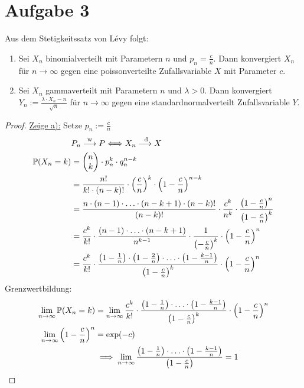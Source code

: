 \documentclass[12pt,a4paper]{article}
\begin{document}
\section*{Aufgabe 3}
Aus dem Stetigkeitssatz von Lévy folgt:
\begin{enumerate}[label=\alph*)]
	\item Sei $X_n$ binomialverteilt mit Parametern $n$ und $p_n=\frac{c}{n}$.
	Dann konvergiert $X_n$ für $n\to\infty$ gegen eine poissonverteilte Zufallsvariable $X$ mit Parameter $c$.
	\item Sei $X_n$ gammaverteilt mit Parametern $n$ und $\lambda>0$.
	Dann konvergiert $Y_n:=\frac{\lambda\cdot X_n-n}{\sqrt{n}}$ für $n\to\infty$ gegen eine standardnormalverteilt Zufallsvariable $Y$.
\end{enumerate}

\begin{proof}
	\underline{Zeige a):} Setze $p_n:=\frac{c}{n}$
	\begin{align*}
		&P_n\overset{\text{w}}{\longrightarrow} P
		\Longleftrightarrow X_n\overset{\text{ d}}{\longrightarrow} X\\
		\mathbb{P}(X_n=k)&=\begin{pmatrix}
			n\\
			k
		\end{pmatrix}\cdot p_n^k\cdot q_n^{n-k}\\
		&=\frac{n!}{k!\cdot(n-k)!}\cdot\left(\frac{c}{n}\right)^k\cdot\left(1-\frac{c}{n}\right)^{n-k}\\
		&=\frac{n\cdot(n-1)\cdot\ldots\cdot(n-k+1)\cdot(n-k)!}{(n-k)!}\cdot\frac{c^k}{n^k}\cdot\frac{\left(1-\frac{c}{n}\right)^n}{\left(1-\frac{c}{n}\right)^k}\\
		&=\frac{c^k}{k!}\cdot\frac{(n-1)\cdot\ldots\cdot(n-k+1)}{n^{k-1}}\cdot\frac{1}{\left(-\frac{c}{n}\right)^k}\cdot\left(1-\frac{c}{n}\right)^n\\
		&=\frac{c^k}{k!}\cdot\frac{\left(1-\frac{1}{n}\right)\cdot\left(1-\frac{2}{n}\right)\cdot\ldots\cdot\left(1-\frac{k-1}{n}\right)}{\left(1-\frac{c}{n}\right)^k}\cdot\left(1-\frac{c}{n}\right)^n
	\end{align*}
	Grenzwertbildung:
	\begin{align*}
		\lim\limits_{n\to\infty}\mathbb{P}(X_n=k)
		&=\lim\limits_{n\to\infty}\frac{c^k}{k!}\cdot\frac{\left(1-\frac{1}{n}\right)\cdot\ldots\cdot\left(1-\frac{k-1}{n}\right)}{\left(1-\frac{c}{n}\right)^k}\cdot\left(1-\frac{c}{n}\right)^n\\
		\lim\limits_{n\to\infty}\left(1-\frac{c}{n}\right)^n
		&=\exp(-c)\\
		&\implies\lim\limits_{n\to\infty}\frac{\left(1-\frac{1}{n}\right)\cdot\ldots\cdot\left(1-\frac{k-1}{n}\right)}{\left(1-\frac{c}{n}\right)}=1
	\end{align*}
	

\end{proof}
\end{document}
